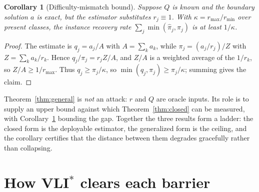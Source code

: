 \documentclass[11pt]{article}
\newtheorem{corollary}{Corollary}
\theoremstyle{remark}
\begin{document}
\begin{corollary}[Difficulty-mismatch bound]
\label{cor:kappa}
Suppose $Q$ is known and the boundary solution $a$ is exact, but the
estimator substitutes $r_j \equiv 1$. With
$\kappa = r_{\max}/r_{\min}$ over present classes, the instance recovery
rate $\sum_j \min(\widehat\pi_j, \pi_j)$ is at least $1/\kappa$.
\end{corollary}

\begin{proof}
The estimate is $q_j = a_j/A$ with $A=\sum_k a_k$, while
$\pi_j = (a_j/r_j)/Z$ with $Z = \sum_k a_k/r_k$. Hence
$q_j/\pi_j = r_j Z/A$, and $Z/A$ is a weighted average of the $1/r_k$, so
$Z/A \ge 1/r_{\max}$. Thus $q_j \ge \pi_j/\kappa$, so
$\min(q_j,\pi_j) \ge \pi_j/\kappa$; summing gives the claim.
\end{proof}

Theorem~\ref{thm:general} is \emph{not} an attack: $r$ and $Q$ are oracle
inputs. Its role is to supply an upper bound against which
Theorem~\ref{thm:closed} can be measured, with
Corollary~\ref{cor:kappa} bounding the gap. Together the three results form a
ladder: the closed form is the deployable estimator, the generalized form is
the ceiling, and the corollary certifies that the distance between them
degrades gracefully rather than collapsing.

\section{How VLI$^*$ clears each barrier}
\end{document}
